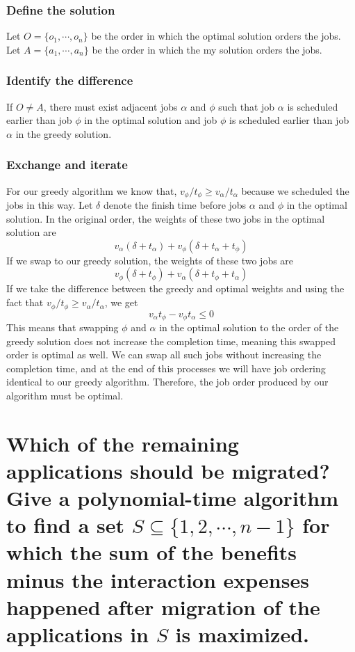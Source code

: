 \documentclass[11pt]{scrartcl}
\begin{document}
\subsubsection{
	Define the solution
}
Let $O =\{o_1, \cdots, o_n \}$ be the order in which the optimal solution orders the jobs.
Let $A =\{a_1, \cdots, a_n \}$ be the order in which the my solution orders the jobs.
\subsubsection{
	Identify the difference
}
If $O \neq A$, there must exist adjacent jobs $\alpha$ and $\phi$ such that job $\alpha$ is scheduled earlier than job $\phi$
in the optimal solution and job $\phi$ is scheduled earlier than job $\alpha$ in the greedy solution.
\subsubsection{
	Exchange and iterate
}
For our greedy algorithm we know that, $v_\phi / t_\phi \geq v_\alpha / t_\alpha$ because we scheduled the jobs in this way.
Let $\delta$ denote the finish time before jobs $\alpha$ and $\phi$ in the optimal solution.
In the original order, the weights of these two jobs in the optimal solution are
$$v_\alpha (\delta + t_\alpha) +  v_\phi (\delta +  t_\alpha + t_\phi)$$
If we swap to our greedy solution, the weights of these two jobs are
$$v_\phi (\delta + t_\phi) +  v_\alpha (\delta +  t_\phi + t_\alpha)$$
If we take the difference between the greedy and optimal weights and using the fact that $v_\phi / t_\phi \geq v_\alpha / t_\alpha$, we get
$$v_\alpha t_\phi - v_\phi t_\alpha  \leq 0$$
This means that swapping $\phi$ and $\alpha$ in the optimal solution to the order of the greedy solution
does not increase the completion time, meaning this swapped 
order is optimal as well. We can swap all such jobs without increasing the completion time, and at the end of this 
processes we will have job ordering identical to our greedy algorithm. Therefore, the job order produced by our algorithm must 
be optimal. 
\pagebreak


	\section{
	  Which of the remaining applications should be migrated? Give a polynomial-time
	  algorithm to find a set $S \subseteq \{1, 2, \cdots , n-1\}$ for which the sum of the benefits minus the
	  interaction expenses happened after migration of the applications in $S$ is maximized.
	 }
\end{document}
